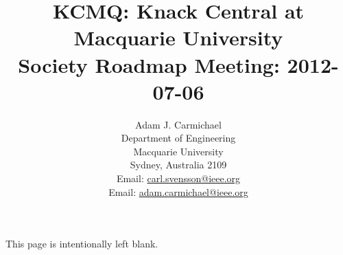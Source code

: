 \title{
  KCMQ: Knack Central at Macquarie University \\
  Society Roadmap Meeting: 2012-07-06
}
%
\author{
  Adam J. Carmichael \\
  Department of Engineering\\
  Macquarie University\\
  Sydney, Australia 2109\\
  Email: \url{carl.svensson@ieee.org} \\
  Email: \url{adam.carmichael@ieee.org}
}%
%

%
\maketitle
%
\tableofcontents
\chapter{}
\vspace*{\fill}
\begin{center}
This page is intentionally left blank.
\end{center}
\vspace*{\fill}



